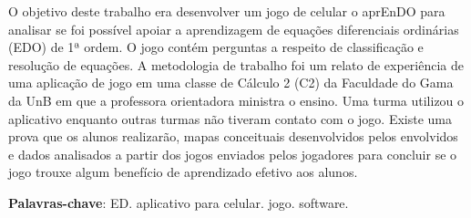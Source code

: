 \begin{resumo}
O objetivo deste trabalho era desenvolver um jogo de celular o aprEnDO para analisar se
 foi possível apoiar a aprendizagem de equações diferenciais ordinárias (EDO) de 1ª ordem.
 O jogo contém perguntas a respeito de classificação e resolução de equações. A metodologia
 de trabalho foi um relato de experiência de uma aplicação de jogo em  uma classe de Cálculo 2 (C2) da Faculdade 
 do Gama da UnB em que a professora orientadora ministra o ensino. Uma turma utilizou o aplicativo enquanto outras turmas não tiveram contato com o jogo. Existe uma prova que os alunos realizarão, mapas conceituais desenvolvidos pelos envolvidos e dados analisados a partir dos jogos enviados pelos jogadores para concluir se o jogo trouxe algum benefício de aprendizado efetivo aos alunos.
	
\begin{comment}
 Com a qualidade de ensino de matemática baixa e contra os métodos muito
 tradicionais de ensino nas salas de aula, resolveu-se desenvolver um 
 aplicativo para celular (iOS e Android) que seja um jogo para o suporte de 
 ensino de equações diferenciais (ED). Será realizada uma pesquisa descritiva
 para o levantamento bibliográfico das características que deverão estar presentes
 no software para dar auxílio a alunos com TDAH junto de técnicas de gamificação 
 para tentar deixar o aprendizado mais prazeroso.
\end{comment}
  
 \begin{comment}
 O resumo deve ressaltar o objetivo, o método, os resultados e as conclusões 
 do documento. A ordem e a extensão
 destes itens dependem do tipo de resumo (informativo ou indicativo) e do
 tratamento que cada item recebe no documento original. O resumo deve ser
 precedido da referência do documento, com exceção do resumo inserido no
 próprio documento. (\ldots) As palavras-chave devem figurar logo abaixo do
 resumo, antecedidas da expressão Palavras-chave:, separadas entre si por
 ponto e finalizadas também por ponto. O texto pode conter no mínimo 150 e 
 no máximo 500 palavras, é aconselhável que sejam utilizadas 200 palavras. 
 E não se separa o texto do resumo em parágrafos.
 \end{comment}

 \vspace{\onelineskip}
    
 \noindent
 \textbf{Palavras-chave}: ED. aplicativo para celular. jogo. software.
\end{resumo}
